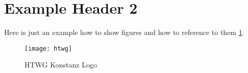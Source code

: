 \section{Example Header 2}

Here is just an example how to show figures and how to reference to them \ref{fig:htwg}.

\begin{figure}[h]
  \centering
  \texttt{[image: htwg]}
  \caption{HTWG Konstanz Logo}
  \label{fig:htwg}
\end{figure}